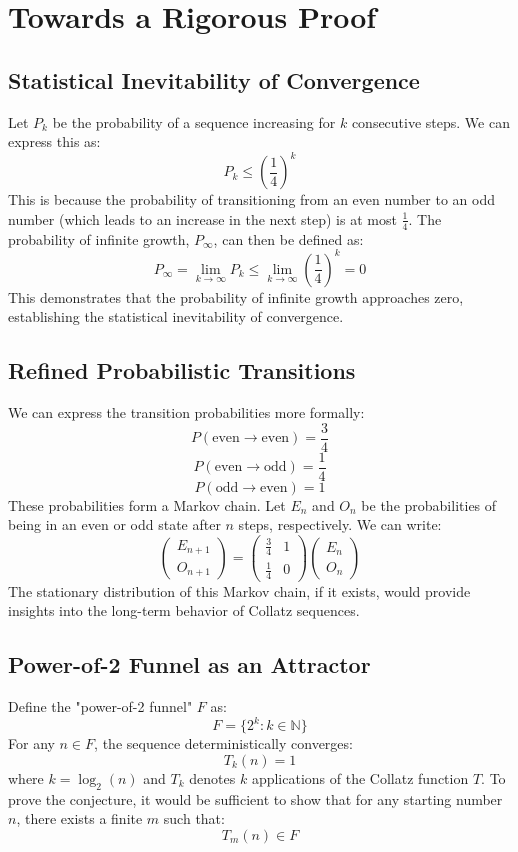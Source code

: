 \documentclass{article}
\begin{document}
\section{Towards a Rigorous Proof}
\subsection{Statistical Inevitability of Convergence}
Let $P_k$ be the probability of a sequence increasing for $k$ consecutive steps. We can express this as:
\[
P_k \leq \left(\frac{1}{4}\right)^k
\]
This is because the probability of transitioning from an even number to an odd number (which leads to an increase in the next step) is at most $\frac{1}{4}$.
The probability of infinite growth, $P_\infty$, can then be defined as:
\[
P_\infty = \lim_{k \to \infty} P_k \leq \lim_{k \to \infty} \left(\frac{1}{4}\right)^k = 0
\]
This demonstrates that the probability of infinite growth approaches zero, establishing the statistical inevitability of convergence.

\subsection{Refined Probabilistic Transitions}
We can express the transition probabilities more formally:
\[
P(\text{even} \rightarrow \text{even}) = \frac{3}{4}
\]
\[
P(\text{even} \rightarrow \text{odd}) = \frac{1}{4}
\]
\[
P(\text{odd} \rightarrow \text{even}) = 1
\]
These probabilities form a Markov chain. Let $E_n$ and $O_n$ be the probabilities of being in an even or odd state after $n$ steps, respectively. We can write:
\[
\begin{pmatrix}
E_{n+1} \\
O_{n+1}
\end{pmatrix}
=
\begin{pmatrix}
\frac{3}{4} & 1 \\
\frac{1}{4} & 0
\end{pmatrix}
\begin{pmatrix}
E_n \\
O_n
\end{pmatrix}
\]
The stationary distribution of this Markov chain, if it exists, would provide insights into the long-term behavior of Collatz sequences.

\subsection{Power-of-2 Funnel as an Attractor}
Define the "power-of-2 funnel" $F$ as:
\[
F = \{2^k : k \in \mathbb{N}\}
\]
For any $n \in F$, the sequence deterministically converges:
\[
T_k(n) = 1
\]
where $k = \log_2(n)$ and $T_k$ denotes $k$ applications of the Collatz function $T$.
To prove the conjecture, it would be sufficient to show that for any starting number $n$, there exists a finite $m$ such that:
\[
T_m(n) \in F
\]
\end{document}
